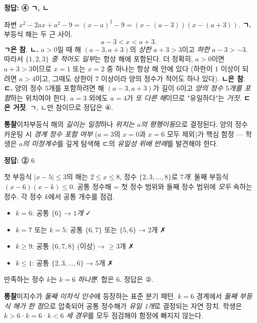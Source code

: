 \documentclass[10pt]{article}
\newcommand{\solnote}[1]{\par\smallskip\noindent
  \begin{tcolorbox}[enhanced, breakable, colback=vB-light, colframe=vB-light,
    boxrule=0pt, arc=3pt, left=10pt, right=10pt, top=4pt, bottom=4pt,
    fontupper=\sffamily\footnotesize\color{vB-ink}]
    \textbf{\color{vB-deep}통찰}\quad #1
  \end{tcolorbox}}
\begin{document}
\begin{answerbox}\sffamily\bfseries 정답: ④ ㄱ, ㄴ\end{answerbox}
 좌변 $x^2 - 2ax + a^2 - 9 = (x - a)^2 - 9 = (x - (a - 3))(x - (a + 3))$.
 \textbf{ㄱ.} 부등식 해는 두 근 사이.
\[ a - 3 < x < a + 3. \]
\textbf{ㄱ은 참}.
 \textbf{ㄴ.} $a > 0$일 때 해 $(a - 3, a + 3)$의 \emph{상한} $a + 3 > 3$이고 \emph{하한} $a - 3 > -3$. 따라서 \emph{$\{1, 2, 3\}$ 중 적어도 일부}는 항상 해에 포함된다. 더 정확히, $a > 0$이면 $a + 3 > 3$이므로 $x = 1$ 또는 $x = 2$ 중 하나는 항상 해 안에 있다 (하한이 $1$ 이상이 되려면 $a > 4$이고, 그때도 상한이 $7$ 이상이라 양의 정수가 적어도 하나 있다). \textbf{ㄴ은 참}.
 \textbf{ㄷ.} 양의 정수 $5$개를 포함하려면 해 $(a - 3, a + 3)$가 길이 $6$이고 \emph{양의 정수 $5$개를 포함}하는 위치여야 한다.
$a = 3$ 외에도 $a = 4$가 \emph{또 다른 해}이므로 "유일하다"는 \emph{거짓}. \textbf{ㄷ은 거짓}.
 ㄱ, ㄴ만 참이므로 정답은 $\textbf{④}$.
\solnote{이차부등식 해의 \emph{길이는 일정}하나 \emph{위치는 $a$의 평행이동}으로 결정된다. 양의 정수 카운팅 시 \emph{경계 정수 포함 여부} ($a = 3$의 $x = 0$과 $x = 6$ 모두 제외)가 핵심 함정 — 학생은 \emph{$a$의 미정계수}를 깊게 탐색해 ㄷ의 \emph{유일성 위배 반례}를 발견해야 한다.}

\begin{answerbox}\sffamily\bfseries 정답: ② $6$\end{answerbox}
 첫 부등식 $|x - 5| \le 3$의 해는 $2 \le x \le 8$, 정수 $\{2, 3, \ldots, 8\}$로 \emph{$7$개}.
 둘째 부등식 $(x - 6)(x - k) \le 0$.
 공통 정수해 = 첫 정수 범위와 둘째 정수 범위에 \emph{모두} 속하는 정수. 각 정수 $k$에서 공통 개수를 점검.
\begin{itemize}\setlength{\itemsep}{0pt}
\item $k = 6$: 공통 $\{6\}$ → \emph{$1$개} ✓
\item $k = 7$ 또는 $k = 5$: 공통 $\{6, 7\}$ 또는 $\{5, 6\}$ → $2$개 ✗
\item $k \ge 9$: 공통 $\{6, 7, 8\}$ (이상) → $\ge 3$개 ✗
\item $k \le 1$: 공통 $\{2, 3, \ldots, 6\}$ → $5$개 ✗
\end{itemize}
 만족하는 정수 $k$는 $k = 6$ \emph{하나뿐}. 합은 $6$.
정답은 $\textbf{②}$.
\solnote{미지수가 \emph{둘째 이차식 인수}에 등장하는 표준 분기 패턴. $k = 6$ 경계에서 \emph{둘째 부등식 해가 한 점}으로 압축되어 공통 정수해가 \emph{유일 1개}로 결정되는 자연 장치. 학생은 $k > 6$·$k = 6$·$k < 6$ \emph{세 경우}를 모두 점검해야 함정에 빠지지 않는다.}
\end{document}
